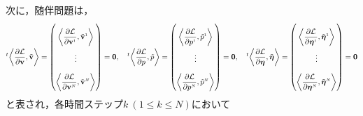 \documentclass[a4paper,xelatex,ja=standard]{bxjsarticle}
\begin{document}
次に，随伴問題は，
\begin{equation}
    \everymath{\displaystyle}
    \setlength{\arraycolsep}{0.5pt}
    \renewcommand{\arraystretch}{2.5}
    \label{eq:adjoint_problem}
    {}^{t}\!\left\langle\frac{\partial \mathcal{L}}{\partial \mathbf{v}}, \tilde{\mathbf{v}}\right\rangle
    = \begin{pmatrix}
        \left\langle\frac{\partial \mathcal{L}}{\partial \mathbf{v}^{\scriptscriptstyle 1}}, \tilde{\mathbf{v}}^{\scriptscriptstyle 1}\right\rangle \\
        \vdots \\
        \left\langle\frac{\partial \mathcal{L}}{\partial \mathbf{v}^{\scriptscriptstyle N}}, \tilde{\mathbf{v}}^{\scriptscriptstyle N}\right\rangle 
    \end{pmatrix}
    =\mathbf{0}
    ,\quad
    {}^{t}\!\left\langle\frac{\partial \mathcal{L}}{\partial p}, \tilde{p}\right\rangle
    = \begin{pmatrix}
        \left\langle\frac{\partial \mathcal{L}}{\partial p^{\scriptscriptstyle 1}}, \tilde{p}^{\scriptscriptstyle 1}\right\rangle \\
        \vdots \\
        \left\langle\frac{\partial \mathcal{L}}{\partial p^{\scriptscriptstyle N}}, \tilde{p}^{\scriptscriptstyle N}\right\rangle 
    \end{pmatrix}
    =\mathbf{0}
    ,\quad
    {}^{t}\!\left\langle\frac{\partial \mathcal{L}}{\partial \boldsymbol{\eta}}, \tilde{\boldsymbol{\eta}}\right\rangle
    = \begin{pmatrix}
        \left\langle\frac{\partial \mathcal{L}}{\partial \boldsymbol{\eta}^{\scriptscriptstyle 1}}, \tilde{\boldsymbol{\eta}}^{\scriptscriptstyle 1}\right\rangle \\
        \vdots \\
        \left\langle\frac{\partial \mathcal{L}}{\partial \boldsymbol{\eta}^{\scriptscriptstyle N}}, \tilde{\boldsymbol{\eta}}^{\scriptscriptstyle N}\right\rangle 
    \end{pmatrix}
    =\mathbf{0}
\end{equation}
と表され，各時間ステップ$k \ (1 \leq k \leq N)$において
\end{document}
